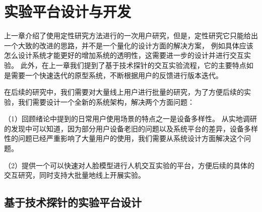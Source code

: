 \chapter{实验平台设计与开发}

上一章介绍了使用定性研究方法进行的一次用户研究，但是，定性研究它只能给出一个大致的改进的思路，并不是一个量化的设计方面的解决方案，
例如具体应该怎么设计系统才能更好的增加系统的透明性，这需要进一步的设计并进行交互实验。
此外，在上一章我们提到了基于技术探针的交互实验流程，它的主要特点如是需要一个快速迭代的原型系统，不断根据用户的反馈进行版本迭代。

在后续的研究中，我们需要对大量线上用户进行批量的研究，为了方便后续的实验，我们需要设计一个全新的系统架构，解决两个方面问题：

（1）回顾绪论中提到的日常用户使用场景的特点之一是设备多样性。
从实地调研的发现中可以知道，因为部分用户设备老旧的问题以及系统平台的差异，设备多样性的问题已经严重影响了大量用户的使用，我们需要从系统设计方面解决这个问题。

（2）提供一个可以快速对人脸模型进行人机交互实验的平台，方便后续的具体的交互研究，同时支持大批量地线上开展实验。






\section{基于技术探针的实验平台设计}



